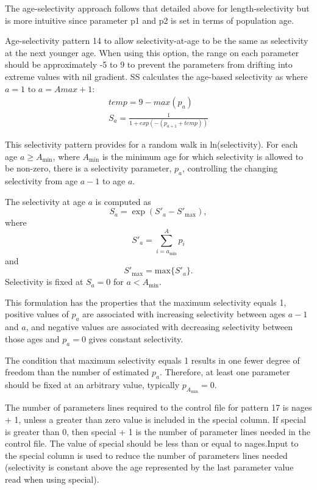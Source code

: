 The age-selectivity approach follows that detailed above for length-selectivity but is more intuitive since parameter p1 and p2 is set in terms of population age. 

Age-selectivity pattern 14 to allow selectivity-at-age to be the same as selectivity at the next younger age.  When using this option, the range on each parameter should be approximately -5 to 9 to prevent the parameters from drifting into extreme values with nil gradient. SS calculates the age-based selectivity as where $a = 1$ to $a = Amax + 1$:
	\begin{equation}
		 \begin{split}
		 temp = 9 - max(p_a)\\
		S_a = \frac{1}{1+exp(-(p_{a+1} + temp))}
		\end{split}
	\end{equation}	

This selectivity pattern provides for a random walk in ln(selectivity).  For each age $a \geq A_{\text{min}}$, where $A_{\text{min}}$ is the minimum age for which selectivity is allowed to be non-zero, there is a selectivity parameter, $p_a$, controlling the changing selectivity from age $a-1$ to age $a$.
	
The selectivity at age $a$ is computed as
	\begin{equation}
	S_a = \exp (S'_a - S'_{\text{max}}),
	\end{equation}
where
	\begin{equation}
	S'_a = \sum_{i = a_{\text{min}}}^A p_i
	\end{equation}
and 
	\begin{equation}
	S'_{\text{max}} = \mbox{max} \{S'_a\}.
	\end{equation}
Selectivity is fixed at $S_a = 0$ for $a < A_{\text{min}}$. 
	
This formulation has the properties that the maximum selectivity equals 1, positive values of $p_a$ are associated with increasing selectivity between ages $a-1$ and $a$, and negative values are associated with decreasing selectivity between those ages and $p_a = 0$ gives constant selectivity.
	
The condition that maximum selectivity equals 1 results in one fewer degree of freedom than the number of estimated $p_a$. Therefore, at least one parameter should be fixed at an arbitrary value, typically $p_{A_{\text{min}}}=0$.

The number of parameters lines required to the control file for pattern 17 is nages + 1, unless a greater than zero value is included in the special column. If special is greater than 0, then special + 1 is the number of parameter lines needed in the control file. The value of special should be less than or equal to nages.Input to the special column  is used to reduce the number of parameters lines needed (selectivity is constant above the age represented by the last parameter value read when using special). 
	
